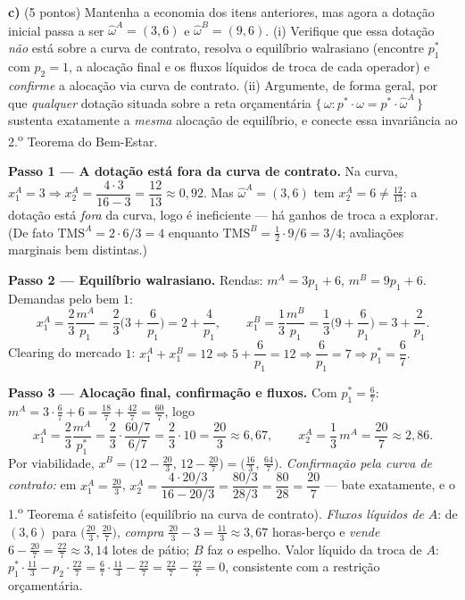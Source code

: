 \textbf{c)} (5 pontos) Mantenha a economia dos itens anteriores, mas agora a dotação inicial passa a ser $\hat\omega^A = (3,6)$ e $\hat\omega^B = (9,6)$. (i) Verifique que essa dotação \emph{não} está sobre a curva de contrato, resolva o equilíbrio walrasiano (encontre $p_1^{*}$ com $p_2=1$, a alocação final e os fluxos líquidos de troca de cada operador) e \emph{confirme} a alocação via curva de contrato. (ii) Argumente, de forma geral, por que \emph{qualquer} dotação situada sobre a reta orçamentária $\{\,\omega : p^{*}\cdot\omega = p^{*}\cdot\hat\omega^A\,\}$ sustenta exatamente a \emph{mesma} alocação de equilíbrio, e conecte essa invariância ao 2.\textsuperscript{o} Teorema do Bem-Estar.
\resolucaobox{5.5cm}
\begin{solucao}
\textbf{Passo 1 --- A dotação está fora da curva de contrato.} Na curva, $x_1^A=3 \Rightarrow x_2^A = \dfrac{4\cdot 3}{16-3} = \dfrac{12}{13}\approx 0{,}92$. Mas $\hat\omega^A=(3,6)$ tem $x_2^A=6\neq \tfrac{12}{13}$: a dotação está \emph{fora} da curva, logo é ineficiente --- há ganhos de troca a explorar. (De fato $\text{TMS}^A = 2\cdot 6/3 = 4$ enquanto $\text{TMS}^B = \tfrac12\cdot 9/6 = 3/4$; avaliações marginais bem distintas.)

\textbf{Passo 2 --- Equilíbrio walrasiano.} Rendas: $m^A = 3p_1 + 6$, $m^B = 9p_1 + 6$. Demandas pelo bem $1$:
\[ x_1^A = \frac{2}{3}\frac{m^A}{p_1} = \frac{2}{3}\Big(3 + \frac{6}{p_1}\Big) = 2 + \frac{4}{p_1}, \qquad x_1^B = \frac{1}{3}\frac{m^B}{p_1} = \frac{1}{3}\Big(9 + \frac{6}{p_1}\Big) = 3 + \frac{2}{p_1}. \]
Clearing do mercado $1$: $x_1^A + x_1^B = 12 \Rightarrow 5 + \dfrac{6}{p_1} = 12 \Rightarrow \dfrac{6}{p_1} = 7 \Rightarrow p_1^{*} = \dfrac{6}{7}.$

\textbf{Passo 3 --- Alocação final, confirmação e fluxos.} Com $p_1^{*}=\tfrac{6}{7}$: $m^A = 3\cdot\tfrac{6}{7} + 6 = \tfrac{18}{7} + \tfrac{42}{7} = \tfrac{60}{7}$, logo
\[ x_1^A = \frac{2}{3}\frac{m^A}{p_1^{*}} = \frac{2}{3}\cdot\frac{60/7}{6/7} = \frac{2}{3}\cdot 10 = \frac{20}{3}\approx 6{,}67, \qquad x_2^A = \frac{1}{3}\,m^A = \frac{20}{7}\approx 2{,}86. \]
Por viabilidade, $x^B = \big(12-\tfrac{20}{3},\,12-\tfrac{20}{7}\big) = \big(\tfrac{16}{3},\,\tfrac{64}{7}\big)$. \emph{Confirmação pela curva de contrato:} em $x_1^A=\tfrac{20}{3}$, $x_2^A=\dfrac{4\cdot 20/3}{16-20/3}=\dfrac{80/3}{28/3}=\dfrac{80}{28}=\dfrac{20}{7}$ --- bate exatamente, e o 1.\textsuperscript{o} Teorema é satisfeito (equilíbrio na curva de contrato). \emph{Fluxos líquidos de} $A$: de $(3,6)$ para $\big(\tfrac{20}{3},\tfrac{20}{7}\big)$, \emph{compra} $\tfrac{20}{3}-3=\tfrac{11}{3}\approx 3{,}67$ horas-berço e \emph{vende} $6-\tfrac{20}{7}=\tfrac{22}{7}\approx 3{,}14$ lotes de pátio; $B$ faz o espelho. Valor líquido da troca de $A$: $p_1^{*}\cdot\tfrac{11}{3} - p_2\cdot\tfrac{22}{7} = \tfrac{6}{7}\cdot\tfrac{11}{3} - \tfrac{22}{7} = \tfrac{22}{7}-\tfrac{22}{7}=0$, consistente com a restrição orçamentária.


\end{solucao}
